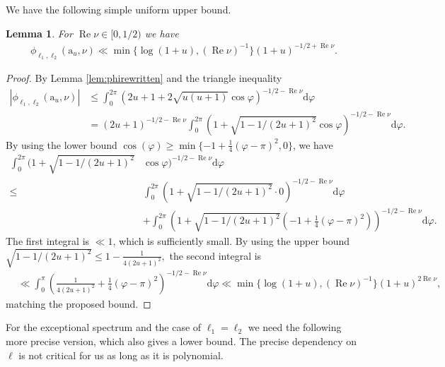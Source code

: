 \documentclass[12pt]{amsart}
\newtheorem{lemma}[theorem]{Lemma}
\theoremstyle{definition}
\theoremstyle{remark}
\numberwithin{equation}{section}
\newcommand{\1}{{\mathbf 1}}
\renewcommand{\Re}{\operatorname{Re}}
\renewcommand{\a}{\mathrm{a}}
\renewcommand{\d}{\mathrm d}
\begin{document}
We have the following simple  uniform upper bound.
\begin{lemma} \label{le:phitrivialbound}
    For $\Re \nu  \in [0,1/2) $ we have
\begin{align*}
      \phi_{\ell_1,\ell_2}(\a_u,\nu)  \ll \min \{  \log (1+u)  , (\Re\nu)^{-1}\} (1+u)^{-1/2 + \Re \nu}.
\end{align*}
\end{lemma}
\begin{proof}
    By Lemma \ref{lem:phirewritten} and the triangle inequality
\begin{align*}
 | \phi_{\ell_1,\ell_2}(\a_u,\nu)| &\leq  \int_0^{2\pi } (2u+1 + 2\sqrt{u(u+1)} \cos \varphi)^{-1/2-\Re\nu}  
\d \varphi \\
&= (2u+1)^{-1/2-\Re\nu} \int_0^{2\pi } (1 + \sqrt{1-1/(2u+1)^2} \cos \varphi)^{-1/2-\Re\nu} 
\d \varphi. 
\end{align*}
By using the lower bound $  \cos(\varphi) \geq \min\{-1+\frac{1}{4}(\varphi-\pi)^2,0\}$,
we have
\begin{align*}
    \int_0^{2\pi } (1 + \sqrt{1-1/(2u+1)^2}& \cos \varphi)^{-1/2-\Re\nu} 
\d \varphi \\
\leq &\int_0^{2\pi } (1 + \sqrt{1-1/(2u+1)^2}  \cdot 0)^{-1/2-\Re\nu}   
\d \varphi \\
&+ \int_0^{2\pi } (1 + \sqrt{1-1/(2u+1)^2} (-1+\tfrac{1}{4}(\varphi-\pi)^2))^{-1/2-\Re\nu}   
\d \varphi.
\end{align*}
The first integral is $\ll 1$, which is sufficiently small. By using the upper bound $  \sqrt{1-1/(2u+1)^2} \leq   1-\frac{1}{4(2u+1)^2},$ the second integral is
\begin{align*}
    &\ll  \int_0^{\pi } (\tfrac{1}{4(2u+1)^2} +\tfrac{1}{4}(\varphi-\pi)^2)^{-1/2-\Re\nu}   \d \varphi \ll \min \{  \log (1+u)  , (\Re\nu)^{-1}\} (1+u)^{2 \Re \nu},
\end{align*}
matching the proposed bound.
\end{proof}

For the exceptional spectrum and the case of $\ell_1=\ell_2$ we need the following more precise version, which also gives a lower bound. The precise dependency  on $\ell$ is not critical for us as long as it is polynomial.
\end{document}
